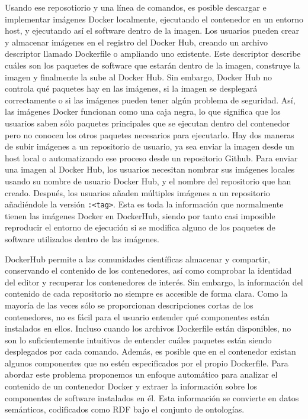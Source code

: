 Usando ese reposotiorio y una línea de comandos, es posible descargar e implementar imágenes Docker localmente, ejecutando el contenedor en un entorno host, y ejecutando así el software dentro de la imagen. Los usuarios pueden crear y almacenar imágenes en el registro del Docker Hub, creando un archivo descriptor llamado Dockerfile o ampliando uno existente.  Este descriptor describe cuáles son los paquetes de software que estarán dentro de la imagen, construye la imagen y finalmente la sube al Docker Hub. Sin embargo, Docker Hub no controla qué paquetes hay en las imágenes, si la imagen se desplegará correctamente o si las imágenes pueden tener algún problema de seguridad. 
Así, las imágenes Docker funcionan como una caja negra, lo que significa que los usuarios saben sólo paquetes principales que se ejecutan dentro del contenedor pero no conocen los otros paquetes necesarios para ejecutarlo.
Hay dos maneras de subir imágenes a un repositorio de usuario, ya sea enviar la imagen desde un host local o automatizando ese proceso desde un repositorio Github. Para enviar una imagen al Docker Hub, los usuarios necesitan nombrar sus imágenes locales usando su nombre de usuario Docker Hub, y el nombre del repositorio que han creado. Después, los usuarios añaden múltiples imágenes a un repositorio añadiéndole la versión \texttt{:<tag>}. Esta es toda la información que normalmente tienen las imágenes Docker en DockerHub, siendo por tanto casi imposible reproducir el entorno de ejecución si se modifica alguno de los paquetes de software utilizados dentro de las imágenes. 
 
 
DockerHub permite a las comunidades científicas almacenar y compartir, conservando el contenido de los contenedores, así como comprobar la identidad del editor y recuperar los contenedores de interés. Sin embargo, la información del contenido de cada repositorio no siempre es accesible de forma clara. 
Como la mayoría de las veces sólo se proporcionan descripciones cortas de los contenedores, no es fácil para el usuario entender qué componentes están instalados en ellos. 
Incluso cuando los archivos Dockerfile están disponibles, no son lo suficientemente intuitivos de entender cuáles paquetes están siendo desplegados por cada comando.
Además, es posible que en el contenedor existan algunos componentes que no estén especificados por el propio Dockerfile. Para abordar este problema proponemos un enfoque automático para analizar el contenido de un contenedor Docker y extraer la información sobre los componentes de software instalados en él. Esta información se convierte en datos semánticos, codificados como RDF bajo el conjunto de ontologías.

